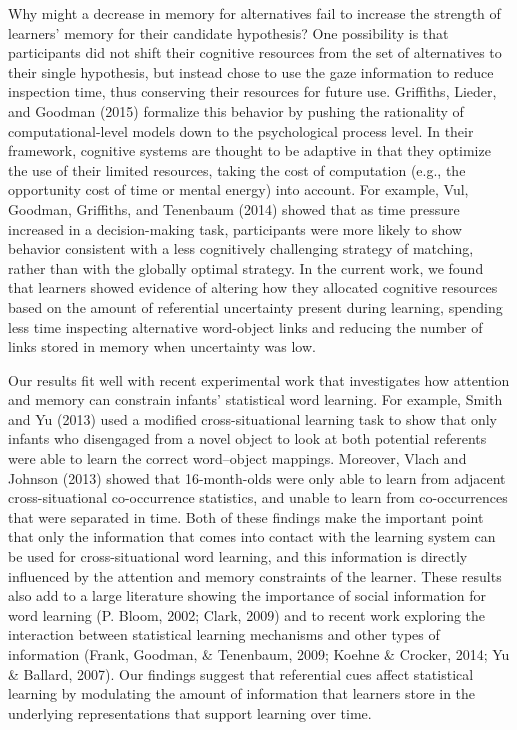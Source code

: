 \documentclass[authoryear, review]{elsarticle}
\begin{document}
Why might a decrease in memory for alternatives fail to increase the
strength of learners' memory for their candidate hypothesis? One
possibility is that participants did not shift their cognitive resources
from the set of alternatives to their single hypothesis, but instead
chose to use the gaze information to reduce inspection time, thus
conserving their resources for future use. Griffiths, Lieder, and
Goodman (2015) formalize this behavior by pushing the rationality of
computational-level models down to the psychological process level. In
their framework, cognitive systems are thought to be adaptive in that
they optimize the use of their limited resources, taking the cost of
computation (e.g., the opportunity cost of time or mental energy) into
account. For example, Vul, Goodman, Griffiths, and Tenenbaum (2014)
showed that as time pressure increased in a decision-making task,
participants were more likely to show behavior consistent with a less
cognitively challenging strategy of matching, rather than with the
globally optimal strategy. In the current work, we found that learners
showed evidence of altering how they allocated cognitive resources based
on the amount of referential uncertainty present during learning,
spending less time inspecting alternative word-object links and reducing
the number of links stored in memory when uncertainty was low.

Our results fit well with recent experimental work that investigates how
attention and memory can constrain infants' statistical word learning.
For example, Smith and Yu (2013) used a modified cross-situational
learning task to show that only infants who disengaged from a novel
object to look at both potential referents were able to learn the
correct word--object mappings. Moreover, Vlach and Johnson (2013) showed
that 16-month-olds were only able to learn from adjacent
cross-situational co-occurrence statistics, and unable to learn from
co-occurrences that were separated in time. Both of these findings make
the important point that only the information that comes into contact
with the learning system can be used for cross-situational word
learning, and this information is directly influenced by the attention
and memory constraints of the learner. These results also add to a large
literature showing the importance of social information for word
learning (P. Bloom, 2002; Clark, 2009) and to recent work exploring the
interaction between statistical learning mechanisms and other types of
information (Frank, Goodman, \& Tenenbaum, 2009; Koehne \& Crocker,
2014; Yu \& Ballard, 2007). Our findings suggest that referential cues
affect statistical learning by modulating the amount of information that
learners store in the underlying representations that support learning
over time.
\end{document}
